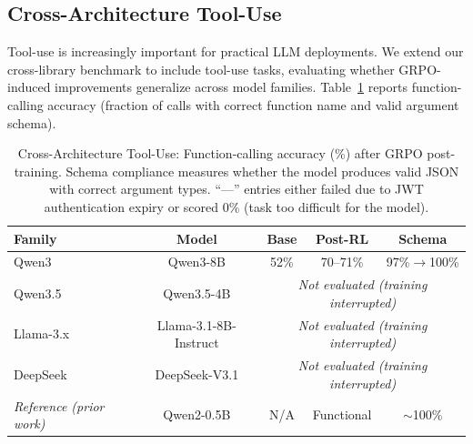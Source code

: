 \documentclass{article}
\begin{document}
\subsection{Cross-Architecture Tool-Use}
\label{sec:tool_use_cross_arch}

Tool-use is increasingly important for practical LLM deployments. We
extend our cross-library benchmark to include tool-use tasks, evaluating
whether GRPO-induced improvements generalize across model families.
Table~\ref{tab:tool_use_cross_arch} reports function-calling accuracy
(fraction of calls with correct function name and valid argument schema).

\begin{table}[htbp]
\centering
\caption{Cross-Architecture Tool-Use: Function-calling accuracy (\%)
after GRPO post-training. Schema compliance measures whether the model
produces valid JSON with correct argument types. ``---'' entries either
failed due to JWT authentication expiry or scored 0\% (task too
difficult for the model).}
\label{tab:tool_use_cross_arch}
\small
\begin{tabular}{@{}lcccc@{}}
\toprule
\textbf{Family} & \textbf{Model} & \textbf{Base} & \textbf{Post-RL} & \textbf{Schema} \\
\midrule
Qwen3 & Qwen3-8B & 52\% & 70--71\% & 97\%$\to$100\% \\
Qwen3.5 & Qwen3.5-4B & \multicolumn{3}{c}{\textit{Not evaluated (training interrupted)}} \\
Llama-3.x & Llama-3.1-8B-Instruct & \multicolumn{3}{c}{\textit{Not evaluated (training interrupted)}} \\
DeepSeek & DeepSeek-V3.1 & \multicolumn{3}{c}{\textit{Not evaluated (training interrupted)}} \\
\midrule
\textit{Reference (prior work)} & Qwen2-0.5B & N/A & Functional & $\sim$100\% \\
\bottomrule
\end{tabular}
\end{table}

\end{document}
